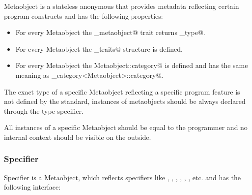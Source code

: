 {\metaobject Metaobject} is a stateless anonymous \verb@struct@ that provides
metadata reflecting certain program constructs and has the following properties:

\begin{itemize}
\item For every {\metaobject Metaobject} the \verb@is_metaobject@ trait returns \verb@true_type@.
\item For every {\metaobject Metaobject} the \verb@metaobject_traits@ structure is defined.
\item For every {\metaobject Metaobject} the {\verb@typedef Metaobject::category@} is defined
and has the same meaning as \verb@metaobject_category<Metaobject>::category@.
\end{itemize}

The exact type of a specific {\metaobject Metaobject} reflecting a specific
program feature is not defined by the standard, instances of metaobjects
should be always declared through the \verb@auto@ type specifier.

All instances of a specific {\metaobject Metaobject} should be equal to
the programmer and no internal context should be visible on the outside.

\subsubsection{Specifier}

{\metaobject Specifier} is a {\metaobject Metaobject}, which reflects specifiers like
\verb@const@, \verb@volatile@, \verb@private@,
\verb@protected@, \verb@public@, \verb@virtual@, etc. and has the following
interface:

